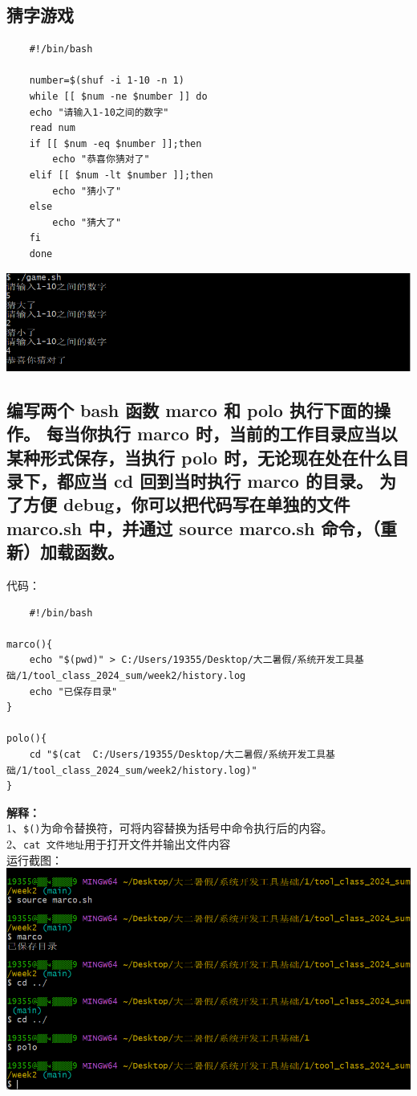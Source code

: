 \documentclass[UTF8,a4paper]{ctexart}
\begin{document}
\subsection{猜字游戏}
\begin{lstlisting}
    #!/bin/bash

    number=$(shuf -i 1-10 -n 1)
    while [[ $num -ne $number ]] do
    echo "请输入1-10之间的数字"
    read num
    if [[ $num -eq $number ]];then
        echo "恭喜你猜对了"
    elif [[ $num -lt $number ]];then
        echo "猜小了"
    else
        echo "猜大了"
    fi
    done
\end{lstlisting}
\includegraphics[width=1\textwidth]{./pictures/game.png}\par

\subsection{编写两个 bash 函数 marco 和 polo 执行下面的操作。 每当你执行 marco 时，当前的工作目录应当以某种形式保存，当执行 polo 时，无论现在处在什么目录下，都应当 cd 回到当时执行 marco 的目录。 为了方便 debug，你可以把代码写在单独的文件 marco.sh 中，并通过 source marco.sh 命令，（重新）加载函数。}
代码：
\begin{lstlisting}
    #!/bin/bash

marco(){
	echo "$(pwd)" > C:/Users/19355/Desktop/大二暑假/系统开发工具基础/1/tool_class_2024_sum/week2/history.log
	echo "已保存目录"
}

polo(){
	cd "$(cat  C:/Users/19355/Desktop/大二暑假/系统开发工具基础/1/tool_class_2024_sum/week2/history.log)"
}
\end{lstlisting}\par
\textbf{解释：}\\
1、\verb|$()|为命令替换符，可将内容替换为括号中命令执行后的内容。\\
2、\verb|cat 文件地址|\quad 用于打开文件并输出文件内容\\
运行截图：\\
\includegraphics[width=1\textwidth]{./pictures/8.png}
\end{document}
